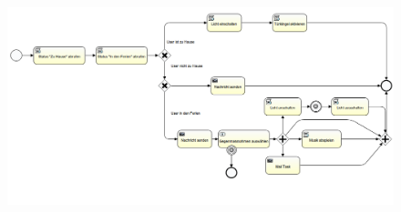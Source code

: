 \documentclass[11pt,a4paper,ngerman]{article}
\begin{document}
\begin{figure}[h]
\centerline{\includegraphics[width=15cm]{./images/DoorBellProcess}}
\end{figure}
\end{document}
